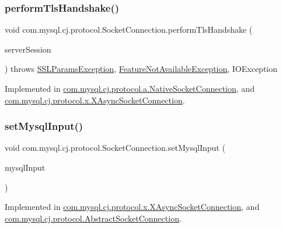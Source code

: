 \subsubsection{\texorpdfstring{perform\+Tls\+Handshake()}{performTlsHandshake()}}
{\footnotesize\ttfamily void com.\+mysql.\+cj.\+protocol.\+Socket\+Connection.\+perform\+Tls\+Handshake (\begin{DoxyParamCaption}\item[{\mbox{\hyperlink{interfacecom_1_1mysql_1_1cj_1_1protocol_1_1_server_session}{Server\+Session}}}]{server\+Session }\end{DoxyParamCaption}) throws \mbox{\hyperlink{classcom_1_1mysql_1_1cj_1_1exceptions_1_1_s_s_l_params_exception}{S\+S\+L\+Params\+Exception}}, \mbox{\hyperlink{classcom_1_1mysql_1_1cj_1_1exceptions_1_1_feature_not_available_exception}{Feature\+Not\+Available\+Exception}}, I\+O\+Exception}



Implemented in \mbox{\hyperlink{classcom_1_1mysql_1_1cj_1_1protocol_1_1a_1_1_native_socket_connection_a00e90b14ed518b12733a936a3b707134}{com.\+mysql.\+cj.\+protocol.\+a.\+Native\+Socket\+Connection}}, and \mbox{\hyperlink{classcom_1_1mysql_1_1cj_1_1protocol_1_1x_1_1_x_async_socket_connection_a3e9822eb06f30e59addd9965056237c1}{com.\+mysql.\+cj.\+protocol.\+x.\+X\+Async\+Socket\+Connection}}.

\mbox{\label{interfacecom_1_1mysql_1_1cj_1_1protocol_1_1_socket_connection_a0b307f24afb5f5e1090f2b2f99f13cf5}} 
\subsubsection{\texorpdfstring{set\+Mysql\+Input()}{setMysqlInput()}}
{\footnotesize\ttfamily void com.\+mysql.\+cj.\+protocol.\+Socket\+Connection.\+set\+Mysql\+Input (\begin{DoxyParamCaption}\item[{Input\+Stream}]{mysql\+Input }\end{DoxyParamCaption})}



Implemented in \mbox{\hyperlink{classcom_1_1mysql_1_1cj_1_1protocol_1_1x_1_1_x_async_socket_connection_af5b71958ccff270ccc3a24afa1b3a0af}{com.\+mysql.\+cj.\+protocol.\+x.\+X\+Async\+Socket\+Connection}}, and \mbox{\hyperlink{classcom_1_1mysql_1_1cj_1_1protocol_1_1_abstract_socket_connection_aa2906d26ec2dfc16c8cbbd983bb80849}{com.\+mysql.\+cj.\+protocol.\+Abstract\+Socket\+Connection}}.

